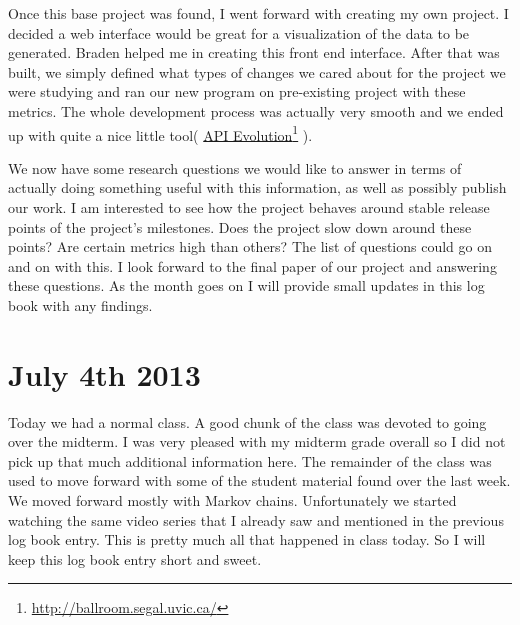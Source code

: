 \documentclass[conference]{IEEEtran}
\newcommand\fnurl[2]{%
  \href{#2}{#1}\footnote{\url{#2}}%
}
\begin{document}
Once this base project was found, I went forward with creating my own project. I decided a web interface would be
great for a visualization of the data to be generated. Braden helped me in creating this front end interface. After
that was built, we simply defined what types of changes we cared about for the project we were studying and ran our
new program on pre-existing project with these metrics. The whole development process was actually very smooth and
we ended up with quite a nice little tool(\fnurl{API Evolution}{http://ballroom.segal.uvic.ca/}). 

We now have some research questions we would like to answer in terms of actually doing something useful with this
information, as well as possibly publish our work. I am interested to see how the project behaves around stable release
points of the project's milestones. Does the project slow down around these points? Are certain metrics high than others?
The list of questions could go on and on with this. I look forward to the final paper of our project and answering
these questions. As the month goes on I will provide small updates in this log book with any findings.

\section{July 4th 2013}
Today we had a normal class. A good chunk of the class was devoted to going over the midterm. I was very pleased
with my midterm grade overall so I did not pick up that much additional information here. The remainder of the class
was used to move forward with some of the student material found over the last week. We moved forward mostly with
Markov chains. Unfortunately we started watching the same video series that I already saw and mentioned in the previous
log book entry. This is pretty much all that happened in class today. So I will keep this log book entry short and sweet.



\balance



\end{document}

